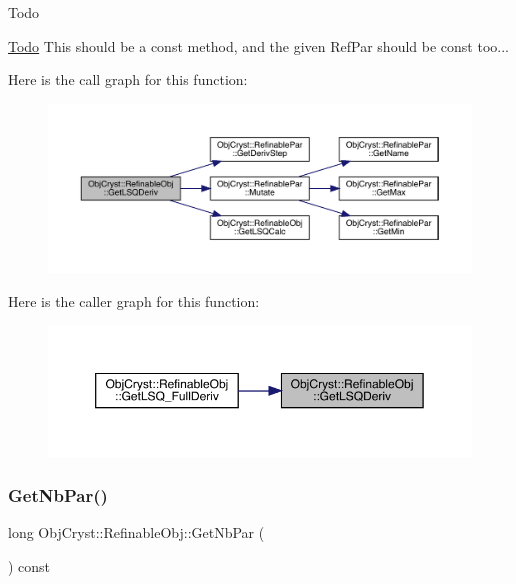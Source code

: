 \begin{DoxyRefDesc}{Todo}
\item[\mbox{\hyperlink{todo__todo000005}{Todo}}]This should be a const method, and the given Ref\+Par should be const too... \end{DoxyRefDesc}
Here is the call graph for this function\+:
\nopagebreak
\begin{figure}[H]
\begin{center}
\leavevmode
\includegraphics[width=350pt]{class_obj_cryst_1_1_refinable_obj_a1946baf8a64267d50ffe6a79b96f4add_cgraph}
\end{center}
\end{figure}
Here is the caller graph for this function\+:
\nopagebreak
\begin{figure}[H]
\begin{center}
\leavevmode
\includegraphics[width=350pt]{class_obj_cryst_1_1_refinable_obj_a1946baf8a64267d50ffe6a79b96f4add_icgraph}
\end{center}
\end{figure}
\mbox{\label{class_obj_cryst_1_1_refinable_obj_a3a45838e4463a17f1d32a892dc48c1dd}} 
\subsubsection{\texorpdfstring{GetNbPar()}{GetNbPar()}}
{\footnotesize\ttfamily long Obj\+Cryst\+::\+Refinable\+Obj\+::\+Get\+Nb\+Par (\begin{DoxyParamCaption}{ }\end{DoxyParamCaption}) const}

